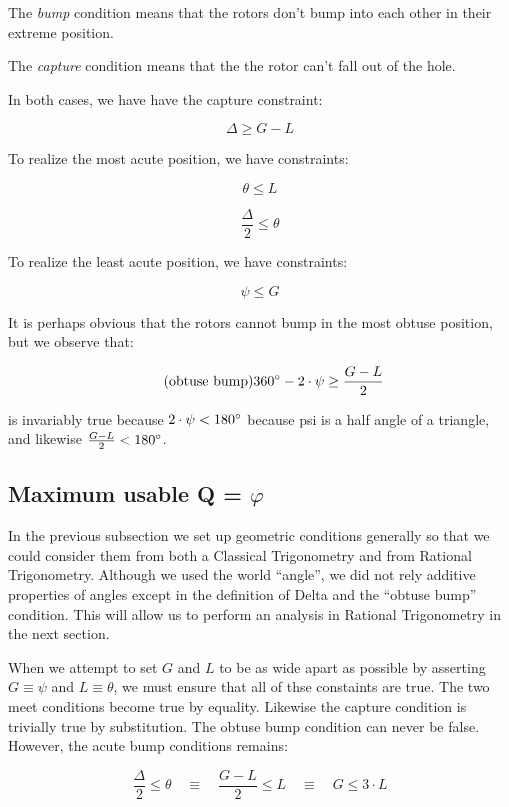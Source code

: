 \documentclass[11pt]{article}
\begin{document}
The \textit{bump} condition means that the rotors don't bump into each other
in their extreme position.

The \textit{capture} condition means that the the rotor can't fall out of the hole.

In both cases, we have have the capture constraint:

\[ \tag{capture} \Delta \geq G - L \]

To realize the most acute position, we have constraints:

\[ \tag{acute meet} \theta \leq L \]

\[ \tag{acute bump} \frac{\Delta}{2} \leq \theta  \]

To realize the least acute position, we have constraints:

\[ \tag{obtuse meet}  \psi \leq G \]

It is perhaps obvious that the rotors cannot bump in the most obtuse position, but we observe that:

\[ \tag{obtuse bump} 360\degree - 2\cdot \psi \geq \frac{G - L}{2} \]

is invariably true because $2\cdot\psi < 180\degree$ because psi is a half angle of a triangle, and likewise $\frac{G - L}{2} < 180\degree$.

\subsection{Maximum usable Q = $\varphi$}

In the previous subsection we set up geometric conditions generally so that we could consider them from
both a Classical Trigonometry and from Rational Trigonometry.  Although we used the world ``angle'', we did not
rely additive properties of angles except in the definition of Delta and the ``obtuse bump'' condition.  This will allow us
to perform an analysis in Rational Trigonometry in the next section.

When we attempt to set $G$ and $L$ to be as wide apart as possible by asserting $G \equiv \psi$ and $L \equiv \theta$, we must
ensure that all of thse constaints are true. The two meet conditions become true by equality. Likewise the capture condition
is trivially true by substitution. The obtuse bump condition can
never be false.  However, the acute bump conditions remains:

\[ \tag{acute bump} \frac{\Delta}{2} \leq \theta  \quad \equiv \quad \frac{G - L}{2} \leq L  \quad \equiv \quad G \leq 3 \cdot L \]
\end{document}

